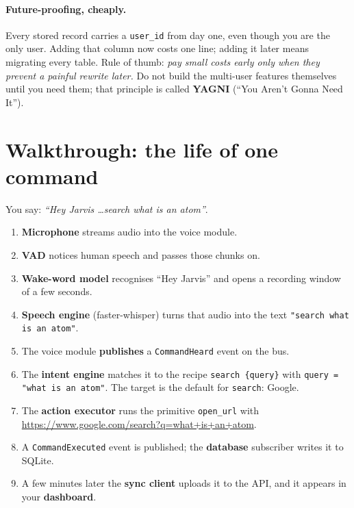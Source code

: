 \documentclass[11pt,a4paper]{article}
\begin{document}
\paragraph{Future-proofing, cheaply.} Every stored record carries a \texttt{user\_id} from
day one, even though you are the only user. Adding that column now costs one line; adding it
later means migrating every table. Rule of thumb: \emph{pay small costs early only when they
prevent a painful rewrite later.} Do not build the multi-user features themselves until you
need them; that principle is called \textbf{YAGNI} (``You Aren't Gonna Need It'').

\section{Walkthrough: the life of one command}

You say: \emph{``Hey Jarvis \ldots search what is an atom''}.

\begin{enumerate}
  \item \textbf{Microphone} streams audio into the voice module.
  \item \textbf{VAD} notices human speech and passes those chunks on.
  \item \textbf{Wake-word model} recognises ``Hey Jarvis'' and opens a recording window of a
        few seconds.
  \item \textbf{Speech engine} (faster-whisper) turns that audio into the text
        \texttt{"search what is an atom"}.
  \item The voice module \textbf{publishes} a \texttt{CommandHeard} event on the bus.
  \item The \textbf{intent engine} matches it to the recipe \texttt{search \{query\}} with
        \texttt{query = "what is an atom"}. The target is the default for \texttt{search}:
        Google.
  \item The \textbf{action executor} runs the primitive \texttt{open\_url} with\\
        \url{https://www.google.com/search?q=what+is+an+atom}.
  \item A \texttt{CommandExecuted} event is published; the \textbf{database} subscriber
        writes it to SQLite.
  \item A few minutes later the \textbf{sync client} uploads it to the API, and it appears
        in your \textbf{dashboard}.
\end{enumerate}
\end{document}
